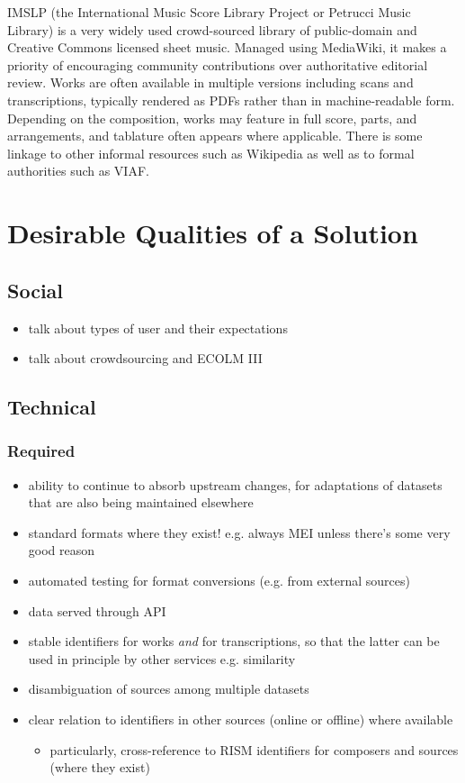 \documentclass[9pt,twocolumn]{extarticle}
\begin{document}
\begin{sloppypar}
  IMSLP (the International Music Score Library Project or Petrucci
  Music Library) is a very widely used crowd-sourced library of
  public-domain and Creative Commons licensed sheet music. Managed
  using MediaWiki, it makes a priority of encouraging community
  contributions over authoritative editorial review. Works are often
  available in multiple versions including scans and transcriptions,
  typically rendered as PDFs rather than in machine-readable
  form. Depending on the composition, works may feature in full score,
  parts, and arrangements, and tablature often appears where
  applicable. There is some linkage to other informal resources such
  as Wikipedia as well as to formal authorities such as VIAF.
  
  \section{Desirable Qualities of a Solution}
  \subsection{Social}

  \begin{itemize}
  \item talk about types of user and their expectations
  \item talk about crowdsourcing and ECOLM III
  \end{itemize}

  
  \subsection{Technical}

  \subsubsection{Required}
  
  \begin{itemize}
  \item ability to continue to absorb upstream changes, for
    adaptations of datasets that are also being maintained elsewhere
  \item standard formats where they exist! e.g. always MEI unless
    there's some very good reason
  \item automated testing for format conversions (e.g. from external sources)
  \item data served through API
  \item stable identifiers for works {\em and} for transcriptions, so
    that the latter can be used in principle by other services
    e.g. similarity
  \item disambiguation of sources among multiple datasets
  \item clear relation to identifiers in other sources (online or
    offline) where available
    \begin{itemize}
    \item particularly, cross-reference to RISM identifiers for
      composers and sources (where they exist)
    \end{itemize}


\end{itemize}
\end{sloppypar}
\end{document}
